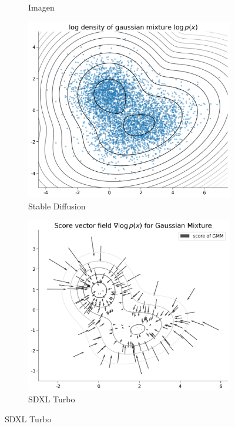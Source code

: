 \begin{itemize}
\begin{figure}[H]
\begin{subfigure}[b]{0.32\textwidth}
            \caption{Imagen}
            \label{fig:imagen_example}
        \end{subfigure}
        
        \vspace{1cm}
        
        \begin{subfigure}[b]{0.48\textwidth}
            \centering
            \includegraphics[width=\textwidth]{figures/D7.png}
            \caption{Stable Diffusion}
            \label{fig:stable_diffusion_example}
        \end{subfigure}
        \hfill
        \begin{subfigure}[b]{0.48\textwidth}
            \centering
            \includegraphics[width=\textwidth]{figures/D8.png}
            \caption{SDXL Turbo}
            \label{fig:sdxl_turbo_example}
        \end{subfigure}
        

\end{figure}
\end{itemize}
